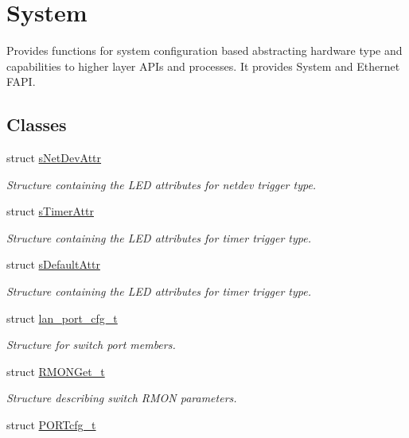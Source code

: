 \hypertarget{group__FAPI__SYSTEM}{\section{System}
\label{group__FAPI__SYSTEM}
}


Provides functions for system configuration based abstracting hardware type and capabilities to higher layer A\-P\-Is and processes. It provides System and Ethernet F\-A\-P\-I.  


\subsection*{Classes}
\begin{DoxyCompactItemize}
\item 
struct \hyperlink{structsNetDevAttr}{s\-Net\-Dev\-Attr}
\begin{DoxyCompactList}\small\item\em Structure containing the L\-E\-D attributes for netdev trigger type. \end{DoxyCompactList}\item 
struct \hyperlink{structsTimerAttr}{s\-Timer\-Attr}
\begin{DoxyCompactList}\small\item\em Structure containing the L\-E\-D attributes for timer trigger type. \end{DoxyCompactList}\item 
struct \hyperlink{structsDefaultAttr}{s\-Default\-Attr}
\begin{DoxyCompactList}\small\item\em Structure containing the L\-E\-D attributes for timer trigger type. \end{DoxyCompactList}\item 
struct \hyperlink{structlan__port__cfg__t}{lan\-\_\-port\-\_\-cfg\-\_\-t}
\begin{DoxyCompactList}\small\item\em Structure for switch port members. \end{DoxyCompactList}\item 
struct \hyperlink{structRMONGet__t}{R\-M\-O\-N\-Get\-\_\-t}
\begin{DoxyCompactList}\small\item\em Structure describing switch R\-M\-O\-N parameters. \end{DoxyCompactList}\item 
struct \hyperlink{structPORTcfg__t}{P\-O\-R\-Tcfg\-\_\-t}

\end{DoxyCompactItemize}
